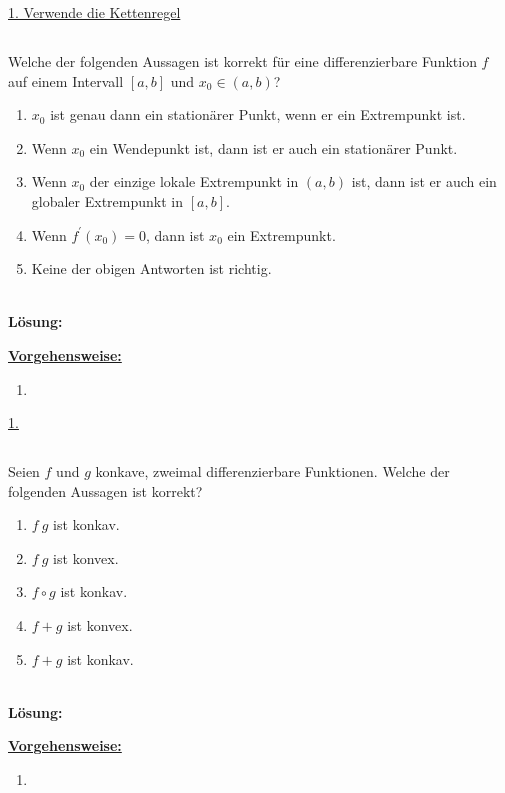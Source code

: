 \underline{1. Verwende die Kettenregel}\\

 


\newpage
\subsection*{}
Welche der folgenden Aussagen ist korrekt für eine differenzierbare Funktion $f$ auf einem Intervall $[a,b]$ und $x_0 \in (a,b)$?
\renewcommand{\labelenumi}{(\alph{enumi})}
\begin{enumerate}
	\item 
	$x_0$ ist genau dann ein stationärer Punkt, wenn er ein Extrempunkt ist.
	\item
	Wenn $x_0$ ein Wendepunkt ist, dann ist er auch ein stationärer Punkt.
	\item
	Wenn $x_0$ der einzige lokale Extrempunkt in $(a,b)$ ist, dann ist er auch ein globaler Extrempunkt in $[a,b]$.
	\item
	Wenn $f^\prime(x_0) = 0$, dann ist $x_0$ ein Extrempunkt.
	\item
	Keine der obigen Antworten ist richtig.
\end{enumerate}
\ \\
\textbf{Lösung:}
\begin{mdframed}
\underline{\textbf{Vorgehensweise:}}
\renewcommand{\labelenumi}{\theenumi.}
\begin{enumerate}
\item 
\end{enumerate}
\end{mdframed}

\underline{1. }\\




\newpage

\subsection*{}
Seien $f$ und $g$ konkave, zweimal differenzierbare Funktionen. Welche der folgenden Aussagen ist korrekt?
\renewcommand{\labelenumi}{(\alph{enumi})}
\begin{enumerate}
	\item 
	$f \ g$ ist konkav.
	\item
	$f \ g$ ist konvex.
	\item
	$f \circ g $ ist konkav.
	\item
	$f +g $ ist konvex.
	\item 
	$f+g$ ist konkav.
\end{enumerate}
\ \\
\textbf{Lösung:}
\begin{mdframed}
\underline{\textbf{Vorgehensweise:}}
\renewcommand{\labelenumi}{\theenumi.}
\begin{enumerate}
\item 
\end{enumerate}
\end{mdframed}

